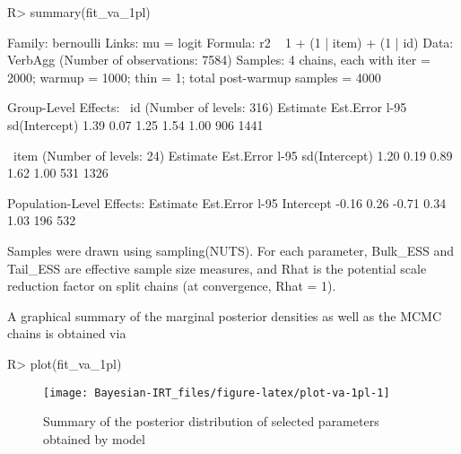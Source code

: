 \documentclass[
]{jss}
\begin{document}
\begin{CodeChunk}

\begin{CodeInput}
R> summary(fit_va_1pl)
\end{CodeInput}

\begin{CodeOutput}
 Family: bernoulli 
  Links: mu = logit 
Formula: r2 ~ 1 + (1 | item) + (1 | id) 
   Data: VerbAgg (Number of observations: 7584) 
Samples: 4 chains, each with iter = 2000; warmup = 1000; thin = 1;
         total post-warmup samples = 4000

Group-Level Effects: 
~id (Number of levels: 316) 
              Estimate Est.Error l-95%
sd(Intercept)     1.39      0.07     1.25     1.54 1.00      906     1441

~item (Number of levels: 24) 
              Estimate Est.Error l-95%
sd(Intercept)     1.20      0.19     0.89     1.62 1.00      531     1326

Population-Level Effects: 
          Estimate Est.Error l-95%
Intercept    -0.16      0.26    -0.71     0.34 1.03      196      532

Samples were drawn using sampling(NUTS). For each parameter, Bulk_ESS
and Tail_ESS are effective sample size measures, and Rhat is the potential
scale reduction factor on split chains (at convergence, Rhat = 1).
\end{CodeOutput}
\end{CodeChunk}

A graphical summary of the marginal posterior densities as well as the
MCMC chains is obtained via

\begin{CodeChunk}

\begin{CodeInput}
R> plot(fit_va_1pl)
\end{CodeInput}
\begin{figure}

{\centering \texttt{[image: Bayesian-IRT\_files/figure-latex/plot-va-1pl-1]} 

}

\caption{Summary of the posterior distribution of selected parameters obtained by model }\label{fig:plot-va-1pl}
\end{figure}
\end{CodeChunk}
\end{document}
